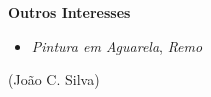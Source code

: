 \documentclass[10pt,a4paper,oneside]{article}
\newlength{\datewidth}
\newlength{\textindent}
\begin{document}
	\vspace{5mm}
	
	\textbf{\hspace{\textindent}Outros Interesses}
	\begin{itemize}
		\item[\hspace{\datewidth}\scriptsize ] \parbox[t]{\dimexpr\linewidth-\datewidth-\textindent}{\textit{Pintura em Aguarela}, \textit{Remo}}
		
	\end{itemize}
	
	\vspace{2cm}
	
	\begin{center}
		(João C. Silva)
	\end{center}
	
\end{document}
